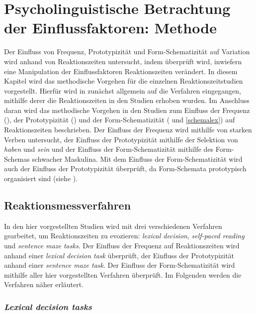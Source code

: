 \chapter{Psycholinguistische Betrachtung der Einflussfaktoren: Methode}\label{psych}

Der Einfluss von Frequenz, Prototypizität und Form-Schematizität auf Variation wird anhand von Reaktionszeiten untersucht, indem überprüft wird, inwiefern eine Manipulation der Einflussfaktoren Reaktionszeiten verändert. In diesem Kapitel wird das methodische Vorgehen für die einzelnen Reaktionszeitstudien vorgestellt. Hierfür wird in  zunächst allgemein auf die Verfahren eingegangen, mithilfe derer die Reaktionszeiten in den Studien erhoben wurden. Im Anschluss daran wird das methodische Vorgehen in den Studien zum Einfluss der Frequenz (), der Prototypizität () und der Form-Schematizität ( und \ref{schemalex}) auf Reaktionszeiten beschrieben. Der Einfluss der Frequenz wird mithilfe von starken Verben untersucht, der Einfluss der Prototypizität mithilfe der Selektion von \textit{haben} und \textit{sein} und der Einfluss der Form-Schematizität mithilfe des Form-Schemas schwacher Maskulina. Mit dem Einfluss der Form-Schematizität wird auch der Einfluss der Prototypizität überprüft, da Form-Schemata prototypisch organisiert sind (siehe ). 

\section{Reaktionsmessverfahren} 
\label{reaktion}

In den hier vorgestellten Studien wird mit drei verschiedenen Verfahren gearbeitet, um Reaktionszeiten zu evozieren: \textit{lexical decision}, \textit{self-paced reading} und \textit{sentence maze tasks}. Der Einfluss der Frequenz auf Reaktionszeiten wird anhand einer \textit{lexical decision task} überprüft, der Einfluss der Prototypizität anhand einer \textit{sentence maze task}. Der Einfluss der Form-Schematizität wird mithilfe aller hier vorgestellten Verfahren überprüft. Im Folgenden werden die Verfahren näher erläutert.

\subsection{\textit{Lexical decision tasks}}
\label{lexdectask}

